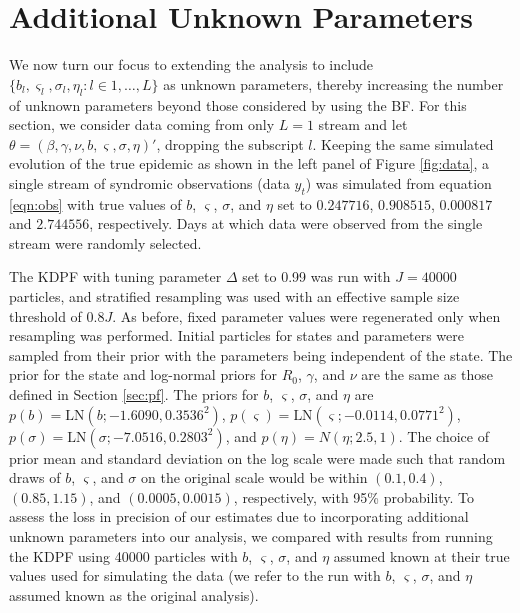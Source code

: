 \documentclass{elsarticle}
\begin{document}
\section{Additional Unknown Parameters \label{sec:extend}}

We now turn our focus to extending the analysis to include $\{b_l,\varsigma_l,\sigma_l,\eta_l:l\in1,\ldots,L\}$ as unknown parameters, thereby increasing the number of unknown parameters beyond those considered by \citet{skvortsov2012monitoring} using the BF. For this section, we consider data coming from only $L = 1$ stream and let $\theta = (\beta, \gamma, \nu, b, \varsigma, \sigma, \eta)'$, dropping the subscript $l$. Keeping the same simulated evolution of the true epidemic as shown in the left panel of Figure \ref{fig:data}, a single stream of syndromic observations (data $y_t$) was simulated from equation \eqref{eqn:obs} with true values of $b$, $\varsigma$, $\sigma$, and $\eta$ set to $0.247716$, $0.908515$, $0.000817$ and $2.744556$, respectively. Days at which data were observed from the single stream were randomly selected.

The KDPF with tuning parameter $\Delta$ set to 0.99 was run with $J = 40000$ particles, and stratified resampling was used with an effective sample size threshold of $0.8J$. As before, fixed parameter values were regenerated only when resampling was performed. Initial particles for states and parameters were sampled from their prior with the parameters being independent of the state. The prior for the state and log-normal priors for $R_0$, $\gamma$, and $\nu$ are the same as those defined in Section \ref{sec:pf}. The priors for $b$, $\varsigma$, $\sigma$, and $\eta$ are \hbox{$p(b) = \mbox{LN}(b; -1.6090, 0.3536^2)$}, \hbox{$p(\varsigma) = \mbox{LN}(\varsigma; -0.0114, 0.0771^2)$}, \hbox{$p(\sigma) = \mbox{LN}(\sigma; -7.0516, 0.2803^2)$}, and \hbox{$p(\eta) = N(\eta; 2.5, 1)$}. The choice of prior mean and standard deviation on the log scale were made such that random draws of $b$, $\varsigma$, and $\sigma$ on the original scale would be within $(0.1, 0.4)$, $(0.85, 1.15)$, and $(0.0005, 0.0015)$, respectively, with 95\% probability. To assess the loss in precision of our estimates due to incorporating additional unknown parameters into our analysis, we compared with results from running the KDPF using 40000 particles with $b$, $\varsigma$, $\sigma$, and $\eta$ assumed known at their true values used for simulating the data (we refer to the run with $b$, $\varsigma$, $\sigma$, and $\eta$ assumed known as the original analysis).
\end{document}
